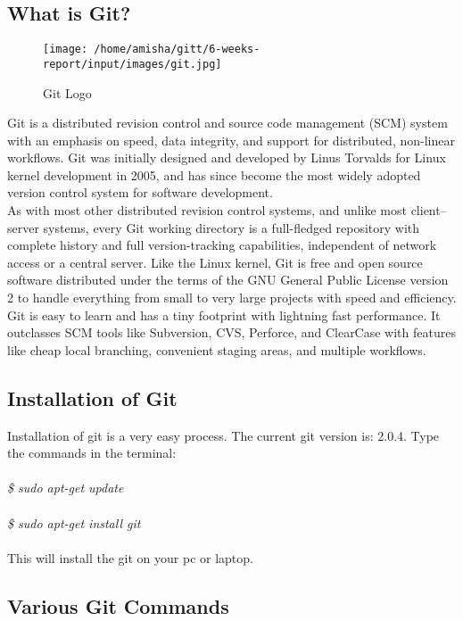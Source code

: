 \subsection{What is Git?}
\begin{figure}[!ht]
\centering
\texttt{[image: /home/amisha/gitt/6-weeks-report/input/images/git.jpg]}                   
\caption{Git Logo}
\hspace{-1.5em}
\end{figure}
Git is a distributed revision control and source code management (SCM) system with an emphasis on speed, data integrity, and support for distributed, non-linear workflows. Git was initially designed and developed by Linus Torvalds for Linux kernel development in 2005, and has since become the most widely adopted version control system for software development.\\

As with most other distributed revision control systems, and unlike most client–server systems, every Git working directory is a full-fledged repository with complete history and full version-tracking capabilities, independent of network access or a central server. Like the Linux kernel, Git is free and open source software distributed under the terms of the GNU General Public License version 2 to handle everything from small to very large projects with speed and efficiency.\\

Git is easy to learn and has a tiny footprint with lightning fast performance. It outclasses SCM tools like Subversion, CVS, Perforce, and ClearCase with features like cheap local branching, convenient staging areas, and multiple workflows.\\

\subsection{Installation of Git}

Installation of git is a very easy process.
The current git version is: 2.0.4.
Type the commands in the terminal:\\\\
\emph{
\$ sudo apt-get update\\\\
\$ sudo apt-get install git\\\\}
This will install the git on your pc or laptop.

\subsection{Various Git Commands}

